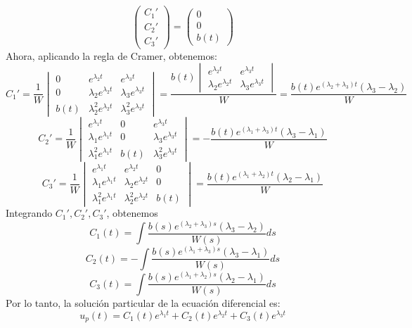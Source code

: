 {\[\begin{pmatrix}
            C_1' \\ C_2' \\ C_3'
        \end{pmatrix}
        =
        \begin{pmatrix}
            0 \\ 0 \\ b(t)
        \end{pmatrix}
    \]
    Ahora, aplicando la regla de Cramer, obtenemos:
    \[
        C_1' = \frac{1}{W} \begin{vmatrix}
            0 & e^{\lambda_2 t} & e^{\lambda_3 t} \\
            0 & \lambda_2 e^{\lambda_2 t} & \lambda_3 e^{\lambda_3 t} \\
            b(t) & \lambda_2^2 e^{\lambda_2 t} & \lambda_3^2 e^{\lambda_3 t}
        \end{vmatrix} = \frac{b(t) \begin{vmatrix}
            e^{\lambda_2 t} & e^{\lambda_3 t} \\
            \lambda_2 e^{\lambda_2 t} & \lambda_3 e^{\lambda_3 t}
        \end{vmatrix} }{W} = \frac{b(t) e^{(\lambda_2 + \lambda_3) t} (\lambda_3 - \lambda_2)}{W}
    \]
    \[
        C_2' = \frac{1}{W} \begin{vmatrix}
            e^{\lambda_1 t} & 0 & e^{\lambda_3 t} \\
            \lambda_1 e^{\lambda_1 t} & 0 & \lambda_3 e^{\lambda_3 t} \\
            \lambda_1^2 e^{\lambda_1 t} & b(t) & \lambda_3^2 e^{\lambda_3 t}
        \end{vmatrix} = -\frac{b(t) e^{(\lambda_1 + \lambda_3) t} (\lambda_3 - \lambda_1)}{W}
    \]
    \[
        C_3' = \frac{1}{W} \begin{vmatrix}
            e^{\lambda_1 t} & e^{\lambda_2 t} & 0 \\
            \lambda_1 e^{\lambda_1 t} & \lambda_2 e^{\lambda_2 t} & 0 \\
            \lambda_1^2 e^{\lambda_1 t} & \lambda_2^2 e^{\lambda_2 t} & b(t)
        \end{vmatrix} = \frac{b(t) e^{(\lambda_1 + \lambda_2) t} (\lambda_2 - \lambda_1)}{W}
    \]
    Integrando $C_1', C_2', C_3'$, obtenemos
    \[
        C_1(t) = \int \frac{b(s) e^{(\lambda_2 + \lambda_3) s} (\lambda_3 - \lambda_2)}{W(s)} ds
    \]
    \[
        C_2(t) = -\int \frac{b(s) e^{(\lambda_1 + \lambda_3) s} (\lambda_3 - \lambda_1)}{W(s)} ds
    \]
    \[
        C_3(t) = \int \frac{b(s) e^{(\lambda_1 + \lambda_2) s} (\lambda_2 - \lambda_1)}{W(s)} ds
    \]
    Por lo tanto, la solución particular de la ecuación diferencial es:
    \[
        u_p(t) = C_1(t) e^{\lambda_1 t} + C_2(t) e^{\lambda_2 t} + C_3(t) e^{\lambda_3 t}
    \]

}

